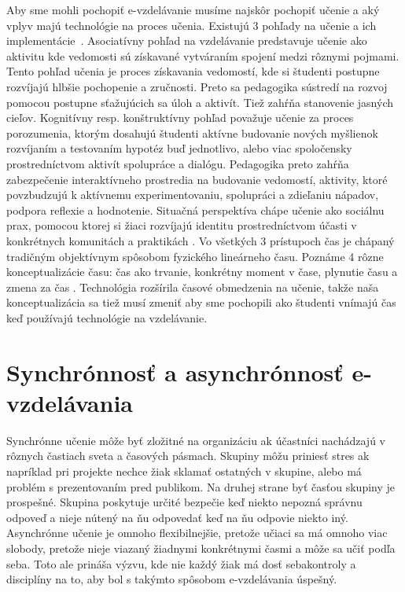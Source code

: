 \documentclass[10pt,twoside,slovak,a4paper]{article}
\begin{document}
Aby sme mohli pochopiť e-vzdelávanie musíme najskôr pochopiť učenie a aký vplyv majú technológie na proces učenia. Existujú 3 pohľady na učenie a ich implementácie~\cite{murdoch32662}. Asociatívny pohľad na vzdelávanie predstavuje učenie ako aktivitu kde vedomosti sú získavané vytváraním spojení medzi rôznymi pojmami. Tento pohľad učenia je proces získavania vedomostí, kde si študenti postupne rozvíjajú hlbšie pochopenie a zručnosti. Preto sa pedagogika sústredí na rozvoj pomocou postupne sťažujúcich sa úloh a aktivít. Tiež zahŕňa stanovenie jasných cieľov. Kognitívny resp. konštruktívny pohľad považuje učenie za proces porozumenia, ktorým dosahujú študenti aktívne budovanie nových myšlienok rozvíjaním a testovaním hypotéz buď jednotlivo, alebo viac spoločensky prostredníctvom aktivít spolupráce a dialógu. Pedagogika preto zahŕňa zabezpečenie interaktívneho prostredia na budovanie vedomostí, aktivity, ktoré povzbudzujú k aktívnemu experimentovaniu, spolupráci a zdieľaniu nápadov, podpora reflexie a hodnotenie. Situačná perspektíva chápe učenie ako sociálnu prax, pomocou ktorej si žiaci rozvíjajú identitu prostredníctvom účasti v konkrétnych komunitách a praktikách \cite{10.2304/elea.2014.11.2.108}. Vo všetkých 3 prístupoch čas je chápaný tradičným objektívnym spôsobom fyzického lineárneho času. Poznáme 4 rôzne konceptualizácie času: čas ako trvanie, konkrétny moment v čase, plynutie času a zmena za čas \cite{BarberaE}. Technológia rozšírila časové obmedzenia na učenie, takže naša konceptualizácia sa tiež musí zmeniť aby sme pochopili ako študenti vnímajú čas keď používajú technológie na vzdelávanie.

\section{Synchrónnosť a asynchrónnosť e-vzdelávania}

Synchrónne učenie môže byť zložitné na organizáciu ak účastníci nachádzajú v rôznych častiach sveta a časových pásmach. Skupiny môžu priniesť stres ak napríklad pri projekte nechce žiak sklamať ostatných v skupine, alebo má problém s prezentovaním pred publikom. Na druhej strane byť časťou skupiny je prospešné. Skupina poskytuje určité bezpečie keď niekto nepozná správnu odpoveď a nieje nútený na ňu odpovedať keď na ňu odpovie niekto iný. Asynchrónne učenie je omnoho flexibilnejšie, pretože učiaci sa má omnoho viac slobody, pretože nieje viazaný žiadnymi konkrétnymi časmi a môže sa učiť podľa seba. Toto ale prináša výzvu, kde nie každý žiak má dosť sebakontroly a disciplíny na to, aby bol s takýmto spôsobom e-vzdelávania úspešný. \cite{10.2304/elea.2014.11.2.135}
\end{document}
